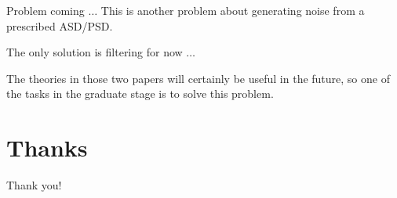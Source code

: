 \documentclass{beamer}
\begin{document}
\begin{frame}[fragile]{Problem coming $\dots$}
    This is another problem about generating noise from a prescribed ASD/PSD.

    The only solution is filtering for now $\dots$

    The theories in those two papers will certainly be useful in the future, so one of the tasks in the graduate stage is to solve this problem.
    
\end{frame}


\section{Thanks}


\begin{frame}
\begin{Huge}
    \centering
    Thank you!
\end{Huge}
\end{frame}
\end{document}
